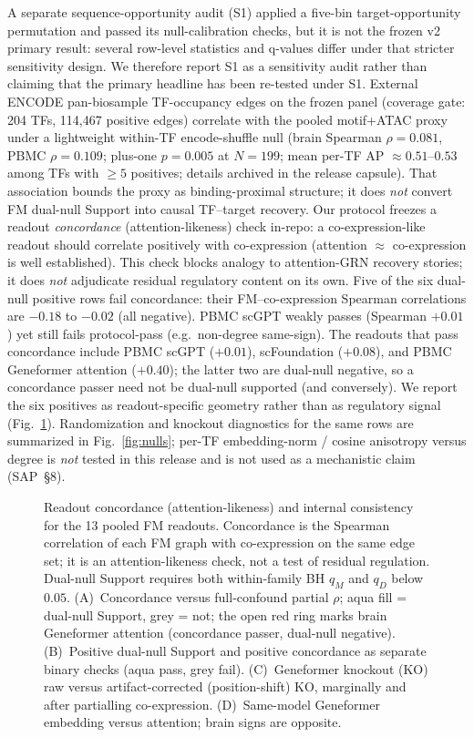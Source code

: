 \documentclass[fleqn,10pt,lineno]{wlpeerj}
\newcommand{\fitfig}[1]{\resizebox{\ifdim\width>\linewidth\linewidth\else\width\fi}{!}{#1}}
\begin{document}
A separate sequence-opportunity audit (S1) applied a five-bin target-opportunity permutation and
passed its null-calibration checks, but it is not the frozen v2 primary result: several row-level
statistics and q-values differ under that stricter sensitivity design. We therefore report S1 as a
sensitivity audit rather than claiming that the primary headline has been re-tested under S1.
External ENCODE pan-biosample TF-occupancy edges on the frozen panel (coverage gate:
204 TFs, 114{,}467 positive edges) correlate with the pooled motif+ATAC proxy under a lightweight
within-TF encode-shuffle null (brain Spearman $\rho=0.081$, PBMC $\rho=0.109$; plus-one
$p=0.005$ at $N=199$; mean per-TF AP $\approx0.51$--$0.53$ among TFs with $\ge5$ positives;
details archived in the release capsule). That association bounds the proxy as
binding-proximal structure; it does \emph{not} convert FM dual-null Support into causal TF--target
recovery.
 Our protocol freezes a readout
\emph{concordance} (attention-likeness) check in-repo: a co-expression-like readout should correlate
positively with co-expression (attention $\approx$ co-expression is well established). This check
blocks analogy to attention-GRN recovery stories; it does \emph{not} adjudicate residual regulatory
content on its own. Five of the six dual-null positive rows fail concordance: their FM--co-expression
Spearman correlations are $-0.18$ to $-0.02$ (all negative). PBMC scGPT weakly passes
(Spearman $+0.01$) yet still fails protocol-pass (e.g.\ non-degree same-sign). The readouts that
pass concordance include PBMC scGPT ($+0.01$), scFoundation ($+0.08$), and PBMC Geneformer
attention ($+0.40$); the latter two are dual-null negative, so a concordance passer need not be
dual-null supported (and conversely).
We report the six positives as readout-specific geometry rather than as regulatory signal
(Fig.~\ref{fig:concordance}). Randomization and knockout diagnostics for the same rows are
summarized in Fig.~\ref{fig:nulls}; per-TF embedding-norm / cosine anisotropy versus degree is
\emph{not} tested in this release and is not used as a mechanistic claim
(SAP~\S8).

\begin{figure}[!tbp]\centering
\fitfig{}
\caption{Readout concordance (attention-likeness) and internal consistency for the 13 pooled FM
readouts. Concordance is the Spearman correlation of each FM graph with co-expression on the same
edge set; it is an attention-likeness check, not a test of residual regulation. Dual-null Support
requires both within-family BH $q_M$ and $q_D$ below $0.05$. (A)~Concordance versus full-confound
partial $\rho$; aqua fill = dual-null Support, grey = not; the open red ring marks brain Geneformer
attention (concordance passer, dual-null negative). (B)~Positive dual-null Support and positive
concordance as separate binary checks (aqua pass, grey fail). (C)~Geneformer knockout (KO) raw
versus artifact-corrected (position-shift) KO, marginally and after partialling co-expression.
(D)~Same-model Geneformer embedding versus attention; brain signs are opposite.}
\label{fig:concordance}
\end{figure}
\end{document}
